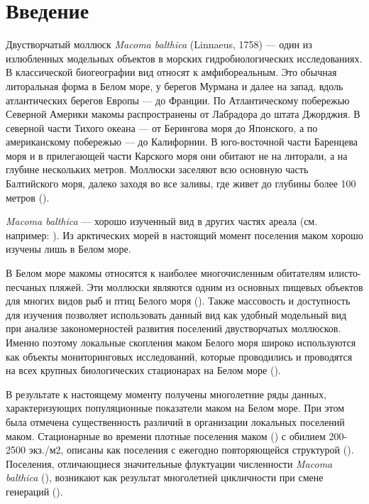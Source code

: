 \section{Введение}
Двустворчатый моллюск {\it Macoma balthica} (Linnaeus, 1758) --- один из излюбленных модельных объектов в морских гидробиологических исследованиях. 
В классической биогеографии вид относят к амфибореальным. 
Это обычная литоральная форма в Белом море, у берегов Мурмана и далее на запад, вдоль атлантических берегов Европы --- до Франции. 
По Атлантическому побережью Северной Америки макомы распространены от Лабрадора до штата Джорджия. 
В северной части Тихого океана --- от Берингова моря до Японского, а по американскому побережью --- до Калифорнии. 
В юго-восточной части Баренцева моря и в прилегающей части Карского моря они обитают  не на литорали, а на глубине нескольких метров. 
Моллюски заселяют всю основную часть Балтийского моря, далеко заходя во все заливы, где живет до глубины более 100 метров (\cite{Zacepin_Filatova_1968}).

{\it Macoma balthica} --- хорошо изученный вид в других частях ареала (см. например: \cite{Segerstrale_1960, Lavoie_1970, Gilbert_1978 , Vincent_et_al_1989}). 
Из арктических морей в настоящий момент поселения маком хорошо изучены лишь в Белом море.

В Белом море макомы относятся к наиболее многочисленным обитателям илисто-песчаных пляжей. 
Эти моллюски являются одним из основных пищевых объектов для многих видов рыб и птиц Белого моря (\cite{Azarov_1963, Percov_1963, Golcev_et_al_1997, Bianki_et_al_2003}). 
Также массовость и доступность для изучения позволяет использовать данный вид как удобный модельный вид при анализе закономерностей развития поселений двустворчатых моллюсков. 
Именно поэтому локальные скопления маком Белого моря широко используются как объекты мониторинговых исследований, которые проводились и проводятся на всех крупных биологических стационарах на Белом море (\cite{Semenova_1974, Maximovich_Kunina_1982, Maximovich_et_al_1991, Poloskin_1996, Nikolaeva_1998, Nazarova_2003, Nazarova_Poloskin_2005}). 

В результате к настоящему моменту получены многолетние ряды данных, характеризующих  популяционные показатели маком на Белом море. 
При этом была отмечена существенность различий в организации локальных поселений маком. 
Стационарные во времени плотные поселения маком (\cite{Semenova_1974, Maximovich_et_al_1991}) с обилием 200-2500 экз./м2, описаны как поселения с ежегодно повторяющейся структурой (\cite{Maximovich_et_al_1991}).  
Поселения, отличающиеся значительные флуктуации численности {\it Macoma balthica} (\cite{Maximovich_1985, Nazarova_Poloskin_2005}), возникают как результат многолетней цикличности при смене генераций (\cite{Maximovich_et_al_1991, Nazarova_2003}).

